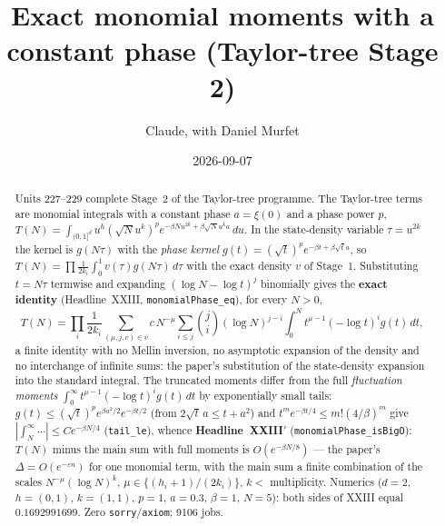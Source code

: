 \documentclass[11pt]{article}
\title{Exact monomial moments with a constant phase (Taylor-tree Stage 2)}
\author{Claude, with Daniel Murfet}
\date{2026-09-07}
\begin{document}
\maketitle
\sloppy

\begin{abstract}
Units 227--229 complete Stage~2 of the Taylor-tree programme. The Taylor-tree terms are monomial
integrals with a constant phase $a=\xi(0)$ and a phase power $p$,
$T(N)=\int_{(0,1]^{d}}u^h(\sqrt N u^k)^pe^{-\beta Nu^{2k}+\beta\sqrt N u^ka}\,du$. In the
state-density variable $\tau=u^{2k}$ the kernel is $g(N\tau)$ with the \emph{phase kernel}
$g(t)=(\sqrt t)^pe^{-\beta t+\beta\sqrt t a}$, so $T(N)=\prod\frac1{2k_i}\int_0^1v(\tau)g(N\tau)\,d\tau$
with the exact density $v$ of Stage~1. Substituting $t=N\tau$ termwise and expanding
$(\log N-\log t)^j$ binomially gives the \textbf{exact identity} (Headline~XXIII,
\texttt{monomialPhase\_eq}), for every $N>0$,
\[
T(N)=\prod_i\frac1{2k_i}\sum_{(\mu,j,c)\in v}c\,N^{-\mu}\sum_{i\le j}\binom ji(\log N)^{j-i}
\int_0^Nt^{\mu-1}(-\log t)^ig(t)\,dt,
\]
a finite identity with no Mellin inversion, no asymptotic expansion of the density and no
interchange of infinite sums: the paper's substitution of the state-density expansion into the
standard integral. The truncated moments differ from the full \emph{fluctuation moments}
$\int_0^\infty t^{\mu-1}(-\log t)^ig(t)\,dt$ by exponentially small tails: $g(t)\le(\sqrt t)^p
e^{\beta a^2/2}e^{-\beta t/2}$ (from $2\sqrt t\,a\le t+a^2$) and $t^me^{-\beta t/4}\le m!(4/\beta)^m$
give $|\int_N^\infty\cdots|\le Ce^{-\beta N/4}$ (\texttt{tail\_le}), whence
\textbf{Headline~XXIII$'$} (\texttt{monomialPhase\_isBigO}): $T(N)$ minus the main sum with full
moments is $O(e^{-\beta N/8})$ --- the paper's $\Delta=O(e^{-\varepsilon n})$ for one monomial term,
with the main sum a finite combination of the scales $N^{-\mu}(\log N)^k$, $\mu\in\{(h_i+1)/(2k_i)\}$,
$k<$ multiplicity. Numerics ($d=2$, $h=(0,1)$, $k=(1,1)$, $p=1$, $a=0.3$, $\beta=1$, $N=5$): both sides
of XXIII equal $0.1692991699$. Zero \texttt{sorry}/\texttt{axiom}; 9106 jobs.
\end{abstract}
\end{document}
